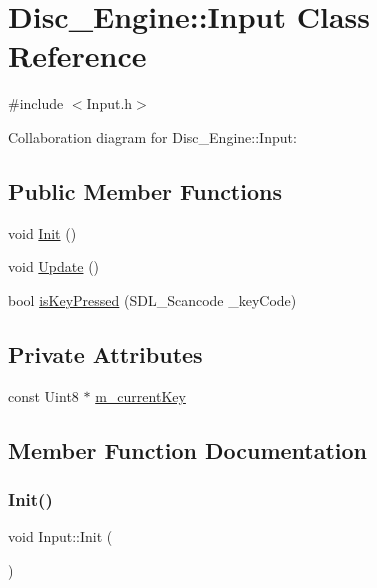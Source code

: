 \hypertarget{class_disc___engine_1_1_input}{}\section{Disc\+\_\+\+Engine\+:\+:Input Class Reference}
\label{class_disc___engine_1_1_input}


{\ttfamily \#include $<$Input.\+h$>$}



Collaboration diagram for Disc\+\_\+\+Engine\+:\+:Input\+:
\subsection*{Public Member Functions}
\begin{DoxyCompactItemize}
\item 
void \mbox{\hyperlink{class_disc___engine_1_1_input_a5197114da7299198826ff7277ee12bff}{Init}} ()
\item 
void \mbox{\hyperlink{class_disc___engine_1_1_input_af80dcfde6dbfe39bf3bc0345c75595ce}{Update}} ()
\item 
bool \mbox{\hyperlink{class_disc___engine_1_1_input_ad3455de83698aa34630444c4b0e5d404}{is\+Key\+Pressed}} (S\+D\+L\+\_\+\+Scancode \+\_\+key\+Code)
\end{DoxyCompactItemize}
\subsection*{Private Attributes}
\begin{DoxyCompactItemize}
\item 
const Uint8 $\ast$ \mbox{\hyperlink{class_disc___engine_1_1_input_aefcdc94a751a9820f9e94837a82133fa}{m\+\_\+current\+Key}}
\end{DoxyCompactItemize}


\subsection{Member Function Documentation}
\mbox{\label{class_disc___engine_1_1_input_a5197114da7299198826ff7277ee12bff}} 
\subsubsection{\texorpdfstring{Init()}{Init()}}
{\footnotesize\ttfamily void Input\+::\+Init (\begin{DoxyParamCaption}{ }\end{DoxyParamCaption})}

